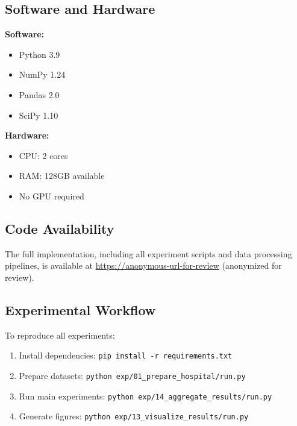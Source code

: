 \documentclass{article}
\begin{document}
\subsection{Software and Hardware}

\textbf{Software:}
\begin{itemize}
    \item Python 3.9
    \item NumPy 1.24
    \item Pandas 2.0
    \item SciPy 1.10
\end{itemize}

\textbf{Hardware:}
\begin{itemize}
    \item CPU: 2 cores
    \item RAM: 128GB available
    \item No GPU required
\end{itemize}

\subsection{Code Availability}

The full implementation, including all experiment scripts and data processing pipelines, is available at \url{https://anonymous-url-for-review} (anonymized for review).

\subsection{Experimental Workflow}

To reproduce all experiments:
\begin{enumerate}
    \item Install dependencies: \texttt{pip install -r requirements.txt}
    \item Prepare datasets: \texttt{python exp/01\_prepare\_hospital/run.py}
    \item Run main experiments: \texttt{python exp/14\_aggregate\_results/run.py}
    \item Generate figures: \texttt{python exp/13\_visualize\_results/run.py}
\end{enumerate}
\end{document}
